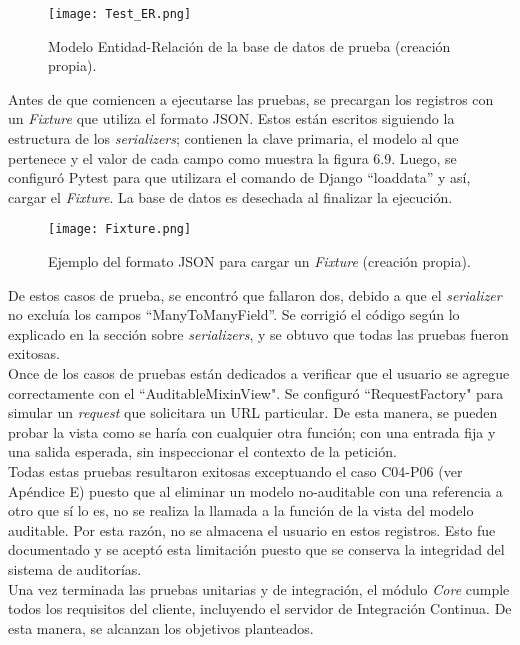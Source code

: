 \begin{figure}[h]
\centering
\texttt{[image: Test\_ER.png]}
\caption{Modelo Entidad-Relación de la base de datos de prueba (creación propia).}
\label{fig:figura6.8}
\end{figure}


Antes de que comiencen a ejecutarse las pruebas, se precargan los registros con un \textit{Fixture} que utiliza el formato JSON.  Estos están escritos siguiendo la estructura de los \textit{serializers}; contienen la clave primaria, el modelo al que pertenece y el valor de cada campo como muestra la figura 6.9. Luego, se configuró Pytest para que utilizara el comando de Django “loaddata” y así, cargar el \textit{Fixture}. La base de datos es desechada al finalizar la ejecución.

\begin{figure}[h]
\centering
\texttt{[image: Fixture.png]}
\caption{Ejemplo del formato JSON para cargar un \textit{Fixture} (creación propia).}
\label{fig:figura6.9}
\end{figure}

De estos casos de prueba, se encontró que fallaron dos, debido a que el \textit{serializer} no excluía los campos “ManyToManyField”. Se corrigió el código según lo explicado en la sección sobre \textit{serializers}, y se obtuvo que todas las pruebas fueron exitosas.\\

Once de los casos de pruebas están dedicados a verificar que el usuario se agregue correctamente con el “AuditableMixinView". Se configuró “RequestFactory" para simular un \textit{request} que solicitara un URL particular. De esta manera, se pueden probar la vista como se haría con cualquier otra función; con una entrada fija y una salida esperada, sin inspeccionar el contexto de la petición.\\

Todas estas pruebas resultaron exitosas exceptuando el caso C04-P06 (ver Apéndice E) puesto que al eliminar un modelo no-auditable con una referencia a otro que sí lo es, no se realiza la llamada a la función de la vista del modelo auditable. Por esta razón, no se almacena el usuario en estos registros. Esto fue documentado y se aceptó esta limitación puesto que se conserva la integridad del sistema de auditorías.\\

Una vez terminada las pruebas unitarias y de integración, el módulo \textit{Core} cumple todos los requisitos del cliente, incluyendo el servidor de Integración Continua. De esta manera, se alcanzan los objetivos planteados.

